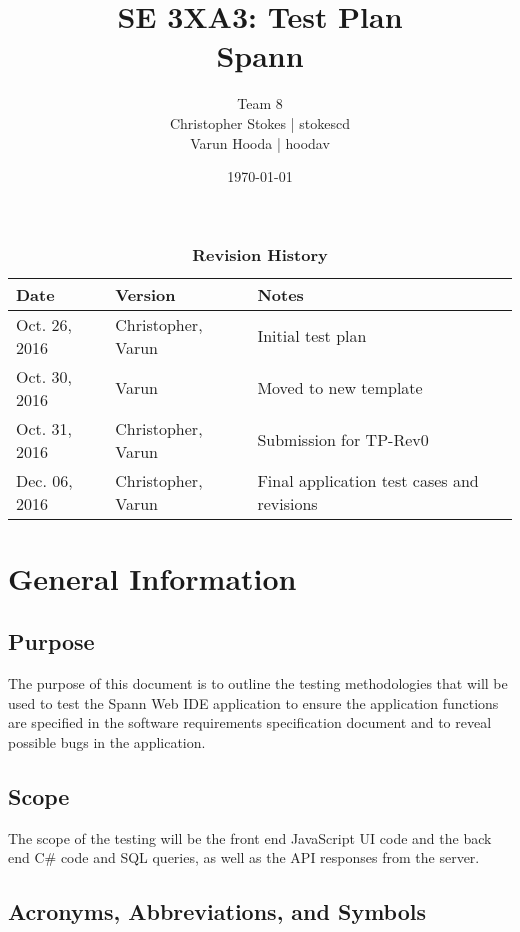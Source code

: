 \documentclass[12pt, titlepage]{article}
\title{SE 3XA3: Test Plan\\Spann}
\author{Team 8
		\\ Christopher Stokes | stokescd
		\\ Varun Hooda | hoodav
}
\date{\today}
\begin{document}
\maketitle

\tableofcontents
\listoftables

\begin{table}[bp]
\caption{\bf Revision History}
\begin{tabularx}{\textwidth}{p{3cm}p{2cm}X}
\toprule {\bf Date} & {\bf Version} & {\bf Notes}\\
\midrule
    Oct. 26, 2016 & Christopher, Varun & Initial test plan\\
    Oct. 30, 2016 & Varun & Moved to new template\\
    Oct. 31, 2016 & Christopher, Varun & Submission for TP-Rev0\\
		Dec. 06, 2016	& Christopher, Varun & Final application test cases and
			revisions\\
\bottomrule
\end{tabularx}
\end{table}

\newpage


\section{General Information}

    \subsection{Purpose}
    The purpose of this document is to outline the testing methodologies that will
    be used to test the Spann Web IDE application to ensure the application
    functions are specified in the software requirements specification document and
    to reveal possible bugs in the application.

    \subsection{Scope}
    The scope of the testing will be the front end JavaScript UI code and the back
    end C\# code and SQL queries, as well as the API responses from the server.

    \subsection{Acronyms, Abbreviations, and Symbols}
      
\end{document}
